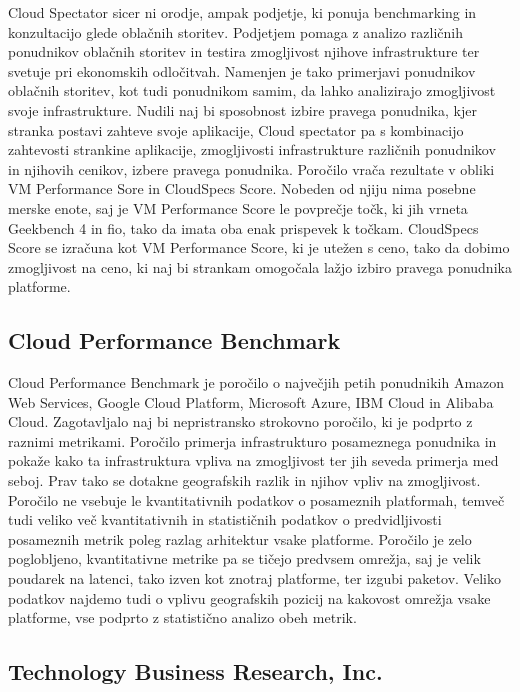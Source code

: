 \cite{cloudSpectator} Cloud Spectator sicer ni orodje, ampak podjetje, ki ponuja benchmarking in konzultacijo glede oblačnih storitev. Podjetjem pomaga z analizo različnih ponudnikov oblačnih storitev in testira zmogljivost njihove infrastrukture ter svetuje pri ekonomskih odločitvah. Namenjen je tako primerjavi ponudnikov oblačnih storitev, kot tudi ponudnikom samim, da lahko analizirajo zmogljivost svoje infrastrukture. Nudili naj bi sposobnost izbire pravega ponudnika, kjer stranka postavi zahteve svoje aplikacije, Cloud spectator pa s kombinacijo zahtevosti strankine aplikacije, zmogljivosti infrastrukture različnih ponudnikov in njihovih cenikov, izbere pravega ponudnika.
Poročilo vrača rezultate v obliki VM Performance Sore in CloudSpecs Score. Nobeden od njiju nima posebne merske enote, saj je VM Performance Score le povprečje točk, ki jih vrneta Geekbench 4 in fio, tako da imata oba enak prispevek k točkam. CloudSpecs Score se izračuna kot VM Performance Score, ki je utežen s ceno, tako da dobimo zmogljivost na ceno, ki naj bi strankam omogočala lažjo izbiro pravega ponudnika platforme.

\subsection{Cloud Performance Benchmark}

\cite{thousandEyes} Cloud Performance Benchmark je poročilo o največjih petih ponudnikih Amazon Web Services, Google Cloud Platform, Microsoft Azure, IBM Cloud in Alibaba Cloud. Zagotavljalo naj bi nepristransko strokovno poročilo, ki je podprto z raznimi metrikami. Poročilo primerja infrastrukturo posameznega ponudnika in pokaže kako ta infrastruktura vpliva na zmogljivost ter jih seveda primerja med seboj. Prav tako se dotakne geografskih razlik in njihov vpliv na zmogljivost.
Poročilo ne vsebuje le kvantitativnih podatkov o posameznih platformah, temveč tudi veliko več kvantitativnih in statističnih podatkov o predvidljivosti posameznih metrik poleg razlag arhitektur vsake platforme. Poročilo je zelo poglobljeno, kvantitativne metrike pa se tičejo predvsem omrežja, saj je velik poudarek na latenci, tako izven kot znotraj platforme, ter izgubi paketov. Veliko podatkov najdemo tudi o vplivu geografskih pozicij na kakovost omrežja vsake platforme, vse podprto z statistično analizo obeh metrik.

\subsection{Technology Business Research, Inc.}

